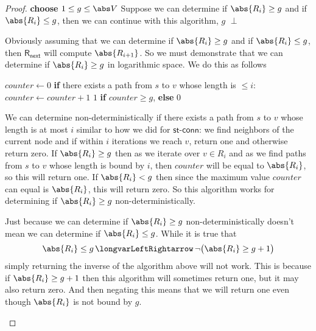 \documentclass[10pt]{article}
\def\iff{\,\longvarLeftRightarrow\,}
\def\stconn{\textsf{st-conn}}
\begin{document}
\begin{proof}
    \def\Rnext{\mathsf{R_{next}}}
    \algorithm
        \Function{$\Rnext$}{$G,s,R_{i-1}$}
            \State \textbf{choose} $1\leq g\leq\abs V$
            \Comment Suppose we can determine if $\abs{R_i}\geq g$ and if $\abs{R_i}\leq g$, then we can continue with this algorithm,\EndComment
            \Return $g$
            \State\Return $\perp$
        \EndFunc
    \ealgorithm

    Obviously assuming that we can determine if $\abs{R_i}\geq g$ and if $\abs{R_i}\leq g$, then $\Rnext$ will compute $\abs{R_{i+1}}$.
    So we must demonstrate that we can determine if $\abs{R_i}\geq g$ in logarithmic space.
    We do this as follows

    \algorithm
        \State $\mathit{counter}\gets0$
            \State\textbf{if} there exists a path from $s$ to $v$ whose length is $\leq i$: $\mathit{counter}\gets\mathit{counter}+1$
        \EndFor
        \State\Return $1$ \textbf{if} $\mathit{counter}\geq g$, \textbf{else} $0$
    \ealgorithm

    We can determine non-deterministically if there exists a path from $s$ to $v$ whose length is at most $i$ similar to how we did for $\stconn$: we find neighbors of the current node and if within $i$
    iterations we reach $v$, return one and otherwise return zero.
    If $\abs{R_i}\geq g$ then as we iterate over $v\in R_i$ and as we find paths from $s$ to $v$ whose length is bound by $i$, then $\mathit{counter}$ will be equal to $\abs{R_i}$, so this will return one.
    If $\abs{R_i}<g$ then since the maximum value $\mathit{counter}$ can equal is $\abs{R_i}$, this will return zero.
    So this algorithm works for determining if $\abs{R_i}\geq g$ non-deterministically.

    \begin{note}

        Just because we can determine if $\abs{R_i}\geq g$ non-deterministically doesn't mean we can determine if $\abs{R_i}\leq g$.
        While it is true that
        \[ \abs{R_i}\leq g \iff \neg\bigl(\abs{R_i}\geq g+1\bigr) \]
        simply returning the inverse of the algorithm above will not work.
        This is because if $\abs{R_i}\geq g+1$ then this algorithm will sometimes return one, but it may also return zero.
        And then negating this means that we will return one even though $\abs{R_i}$ is not bound by $g$.

    \end{note}


\end{proof}
\end{document}
